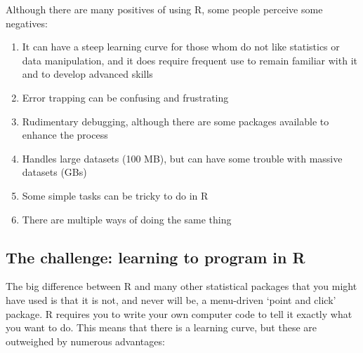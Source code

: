 \documentclass[
]{book}
\begin{document}
Although there are many positives of using R, some people perceive some negatives:

\begin{enumerate}
\def\labelenumi{\arabic{enumi}.}
\item
  It can have a steep learning curve for those whom do not like statistics or data manipulation, and it does require frequent use to remain familiar with it and to develop advanced skills
\item
  Error trapping can be confusing and frustrating
\item
  Rudimentary debugging, although there are some packages available to enhance the process
\item
  Handles large datasets (100 MB), but can have some trouble with massive datasets (GBs)
\item
  Some simple tasks can be tricky to do in R
\item
  There are multiple ways of doing the same thing
\end{enumerate}

\hypertarget{the-challenge-learning-to-program-in-r}{%
\subsection{The challenge: learning to program in R}\label{the-challenge-learning-to-program-in-r}}

The big difference between R and many other statistical packages that you might have used is that it is not, and never will be, a menu-driven `point and click' package. R requires you to write your own computer code to tell it exactly what you want to do. This means that there is a learning curve, but these are outweighed by numerous advantages:
\end{document}
